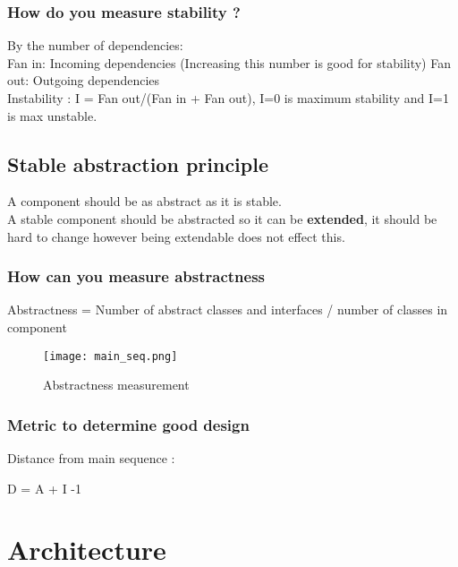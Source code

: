 \documentclass[11pt]{scrartcl} %
\begin{document}
\subsubsection{How do you measure stability ?}

By the number of dependencies:\\

Fan in: Incoming dependencies (Increasing this number is good for
stability) Fan out: Outgoing dependencies\\

Instability : I = Fan out/(Fan in + Fan out), I=0 is maximum stability
and I=1 is max unstable.

\subsection{Stable abstraction principle}

A component should be as abstract as it is stable.\\

A stable component should be abstracted so it can be \textbf{extended},
it should be hard to change however being extendable does not effect
this.

\subsubsection{How can you measure abstractness}

Abstractness = Number of abstract classes and interfaces / number of
classes in component

\begin{figure}[h] %
	\centering
	\texttt{[image: main\_seq.png]} %
	\caption{Abstractness measurement}
\end{figure}

\subsubsection{Metric to determine good design}

Distance from main sequence :

D = \textbar{} A + I -1 \textbar{}

\section{Architecture}
\end{document}
